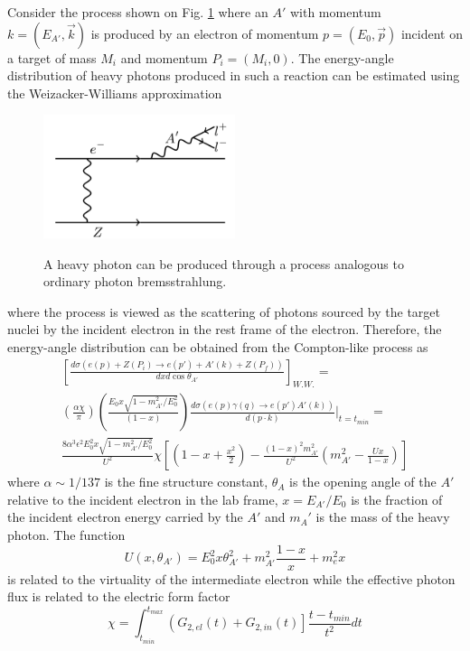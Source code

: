 Consider the process shown on Fig. \ref{fig:ap_production} where an $A'$ with
momentum $k = (E_{A'}, \vec{k})$ is produced by an electron of momentum 
$p = (E_0, \vec{p})$ incident on a target of mass $M_i$ and momentum 
$P_i = (M_i, 0)$. The energy-angle distribution of heavy photons produced in 
such a reaction can be estimated using the Weizacker-Williams approximation 
\begin{figure}[t]
    \centering
    \caption{A heavy photon can be produced through a process analogous to 
             ordinary photon bremsstrahlung.}
    \includegraphics[width=0.5\textwidth]{images/aprime_brem.png}
    \label{fig:ap_production}
\end{figure}  
\cite{Bjorken2009, Tsai1986} where the process is viewed as the scattering of
photons sourced by the target nuclei by the incident electron in the rest frame
of the electron.  Therefore, the energy-angle distribution can be obtained from
the Compton-like process as
\begin{equation}
    \begin{split}
        \left[ \frac{d\sigma(e(p) + Z(P_i) \rightarrow e(p') + A'(k) + Z(P_f))}{dx d\cos\theta_{A'}} \right]_{W.W.} = \\
        \left( \frac{\alpha \chi}{\pi} \right) \left(\frac{E_0 x \sqrt{ 1 - m_{A'}^2/E_0^2}}{(1 - x)} \right) 
        \frac{d\sigma(e(p)\gamma(q) \rightarrow e(p') A'(k))}{d(p \cdot k)} |_{t = t_{min}} = \\
    \frac{8 \alpha^{3} \epsilon^{2} E_{0}^2 x \sqrt{1-m_{A'}^{2}/E_{0}^{2}}}{U^{2}} \chi
    \left [ \left (1 - x + \frac{x^{2}}{2} \right )  - \frac{(1-x)^{2} m_{A'}^{2}}{U^{2}}
    \left(m_{A'}^{2} - \frac{Ux}{1-x} \right) \right]
    \end{split}
    \label{eqn:ap_diff_cross}
\end{equation}
where $\alpha \sim 1/137$ is the fine structure constant, $\theta_{A}$ is the
opening angle of the $A'$ relative to the incident electron in the lab frame, 
$x = E_{A'}/E_{0}$ is the fraction of the incident electron energy carried by
the $A'$ and $m_A'$ is the mass of the heavy photon. The function 
\begin{equation}
    U(x, \theta_{A'}) = E_{0}^{2}x\theta_{A'}^{2} 
    + m_{A'}^{2}\frac{1-x}{x} + m_{e}^2 x
\end{equation}
is related to the virtuality of the intermediate electron while the effective
photon flux is related to the electric form factor
\begin{equation}
    \chi = \int_{t_{min}}^{t_{max}} \left(G_{2,el}(t) + G_{2,in}(t) \right] \frac{t - t_{min}}{t^2} dt
\end{equation}

